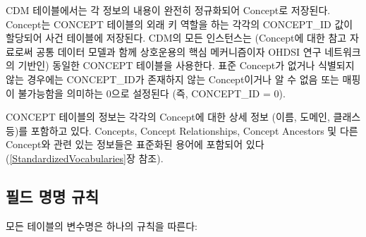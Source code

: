 \documentclass[11pt]{book}
\theoremstyle{definition}
\theoremstyle{definition}
\theoremstyle{definition}
\theoremstyle{remark}
\begin{document}
CDM 테이블에서는 각 정보의 내용이 완전히 정규화되어 Concept로 저장된다.
Concept는 CONCEPT 테이블의 외래 키 역할을 하는 각각의 CONCEPT\_ID 값이
할당되어 사건 테이블에 저장된다. CDM의 모든 인스턴스는 (Concept에 대한
참고 자료로써 공통 데이터 모델과 함께 상호운용의 핵심 메커니즘이자 OHDSI
연구 네트워크의 기반인) 동일한 CONCEPT 테이블을 사용한다. 표준 Concept가
없거나 식별되지 않는 경우에는 CONCEPT\_ID가 존재하지 않는 Concept이거나
알 수 없음 또는 매핑이 불가능함을 의미하는 0으로 설정된다 (즉,
CONCEPT\_ID = 0).

CONCEPT 테이블의 정보는 각각의 Concept에 대한 상세 정보 (이름, 도메인,
클래스 등)를 포함하고 있다. Concepts, Concept Relationships, Concept
Ancestors 및 다른 Concept와 관련 있는 정보들은 표준화된 용어에 포함되어
있다 (\ref{StandardizedVocabularies}장 참조).

\subsection{필드 명명 규칙}\label{--}

모든 테이블의 변수명은 하나의 규칙을 따른다:
\end{document}
